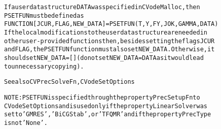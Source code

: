 \begin{alltt}
   If a user data structure DATA was specified in CVodeMalloc, then
   PSETFUN must be defined as
        FUNCTION [JCUR, FLAG, NEW_DATA] = PSETFUN(T,Y,FY,JOK,GAMMA,DATA)
   If the local modifications to the user data structure are needed in
   other user-provided functions then, besides setting the flags JCUR
   and FLAG, the PSETFUN function must also set NEW_DATA. Otherwise, it 
   should set NEW_DATA=[] (do not set NEW_DATA = DATA as it would lead
   to unnecessary copying).

   See also CVPrecSolveFn, CVodeSetOptions

   NOTE: PSETFUN is specified through the property PrecSetupFn to
   CVodeSetOptions and is used only if the property LinearSolver was
   set to 'GMRES', 'BiCGStab', or 'TFQMR' and if the property PrecType
   is not 'None'.
\end{alltt}






\vspace{0.1in}